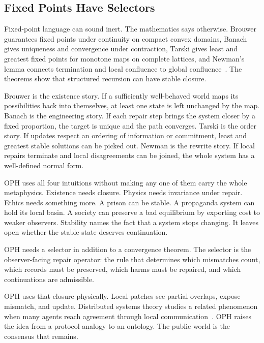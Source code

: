 \documentclass[11pt]{article}
\theoremstyle{remark}
\theoremstyle{plain}
\begin{document}
\subsection{Fixed Points Have Selectors}

Fixed-point language can sound inert. The mathematics says otherwise. Brouwer guarantees fixed
points under continuity on compact convex domains, Banach gives uniqueness and
convergence under contraction, Tarski gives least and greatest fixed points for
monotone maps on complete lattices, and Newman's lemma connects termination and
local confluence to global confluence~\cite{Brouwer1912,Banach1922,Tarski1955,Newman1942}.
The theorems show that structured recursion can have stable closure.

Brouwer is the existence story. If a sufficiently well-behaved world maps its
possibilities back into themselves, at least one state is left unchanged by the
map. Banach is the engineering story. If each repair step brings the system
closer by a fixed proportion, the target is unique and the path converges.
Tarski is the order story. If updates respect an ordering of information or
commitment, least and greatest stable solutions can be picked out. Newman is the
rewrite story. If local repairs terminate and local disagreements can be joined,
the whole system has a well-defined normal form.

OPH uses all four intuitions without making any one of them carry the whole
metaphysics. Existence needs closure. Physics needs invariance under repair.
Ethics needs something more. A prison can be stable. A propaganda system can
hold its local basin. A society can preserve a bad equilibrium by exporting cost
to weaker observers. Stability names the fact that a system stops changing. It
leaves open whether the stable state deserves continuation.

OPH needs a selector in addition to a convergence theorem. The
selector is the observer-facing repair operator: the rule that determines which
mismatches count, which records must be preserved, which harms must be repaired,
and which continuations are admissible.

OPH uses that closure physically. Local patches see partial overlaps, expose
mismatch, and update. Distributed systems theory
studies a related phenomenon when many agents reach agreement through local
communication~\cite{Olfati2007,Lamport1982}. OPH raises the idea from a
protocol analogy to an ontology. The public world is the consensus that remains.
\end{document}
